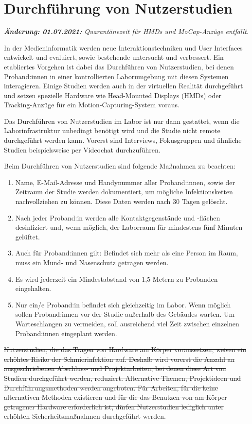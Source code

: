 \section{Durchführung von Nutzerstudien}\label{sec:nutzerstudien}
\emph{\textbf{Änderung: 01.07.2021:} Quarantänezeit für HMDs und MoCap-Anzüge entfällt. }

\noindent
In der Medieninformatik werden neue Interaktionstechniken und User Interfaces entwickelt und evaluiert, sowie bestehende untersucht und verbessert. Ein etabliertes Vorgehen ist dabei das Durchführen von Nutzerstudien, bei denen Proband:innen in einer kontrollierten Laborumgebung mit diesen Systemen interagieren. Einige Studien werden auch in der virtuellen Realität durchgeführt und setzen spezielle Hardware wie Head-Mounted Displays (HMDs) oder Tracking-Anzüge für ein Motion-Capturing-System voraus.

\medskip
\noindent
Das Durchführen von Nutzerstudien im Labor ist nur dann gestattet, wenn die Laborinfrastruktur unbedingt benötigt wird und die Studie nicht remote durchgeführt werden kann. Vorerst sind Interviews, Fokusgruppen und ähnliche Studien beispielsweise per Videochat durchzuführen.

\noindent
Beim Durchführen von Nutzerstudien sind folgende Maßnahmen zu beachten:

\begin{enumerate}
    \item Name, E-Mail-Adresse und Handynummer aller Proband:innen, sowie der Zeitraum der Studie werden dokumentiert, um mögliche Infektionsketten nachvollziehen zu können. Diese Daten werden nach 30 Tagen gelöscht.
    \item Nach jeder Proband:in werden alle Kontaktgegenstände und -flächen desinfiziert und, wenn möglich, der Laborraum für mindestens fünf Minuten gelüftet.
    \item Auch für Proband:innen gilt: Befindet sich mehr als eine Person im Raum, muss ein Mund- und Nasenschutz getragen werden.
    \item Es wird jederzeit ein Mindestabstand von 1,5 Metern zu Probanden eingehalten.
    \item Nur ein/e Proband:in befindet sich gleichzeitig im Labor. Wenn möglich sollen Proband:innen vor der Studie außerhalb des Gebäudes warten. Um Warteschlangen zu vermeiden, soll ausreichend viel Zeit zwischen einzelnen Proband:innen eingeplant werden.
\end{enumerate}

\noindent
\sout{Nutzerstudien, die das Tragen von Hardware am Körper voraussetzen, weisen ein erhöhtes Risiko der Schmierinfektion auf. Deshalb wird vorerst die Anzahl an ausgeschriebenen Abschluss- und Projektarbeiten, bei denen diese Art von Studien durchgeführt werden, reduziert. Alternative Themen, Projektideen und Durchführungsmethoden werden angeboten.
Für Arbeiten, für die keine alternativen Methoden existieren und für die das Benutzen von am Körper getragener Hardware erforderlich ist, dürfen Nutzerstudien lediglich unter erhöhten Sicherheitsmaßnahmen durchgeführt werden.}

